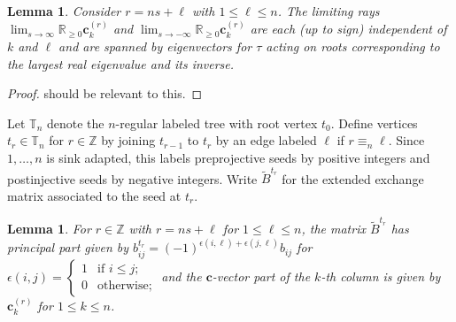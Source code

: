 \documentclass{amsart}
\newtheorem{lemma}[theorem]{Lemma}
\numberwithin{theorem}{section}
\newcommand{\bfc}{\boldsymbol{c}}
\newcommand{\RR}{\mathbb{R}}
\newcommand{\TT}{\mathbb{T}}
\newcommand{\ZZ}{\mathbb{Z}}
\begin{document}
  \begin{lemma}
    Consider $r=ns+\ell$ with $1\le\ell\le n$.
    The limiting rays $\lim_{s\to\infty} \RR_{\ge0}\bfc^{(r)}_k$ and $\lim_{s\to-\infty} \RR_{\ge0}\bfc^{(r)}_k$ are each (up to sign) independent of $k$ and $\ell$ and are spanned by eigenvectors for $\tau$ acting on roots corresponding to the largest real eigenvalue and its inverse.
  \end{lemma}
  \begin{proof}
    \cite{Tak94} should be relevant to this.
  \end{proof}

  Let $\TT_n$ denote the $n$-regular labeled tree with root vertex $t_0$.
  Define vertices $t_r\in\TT_n$ for $r\in\ZZ$ by joining $t_{r-1}$ to $t_r$ by an edge labeled $\ell$ if $r\equiv_n\ell$.
  Since $1,\ldots,n$ is sink adapted, this labels preprojective seeds by positive integers and postinjective seeds by negative integers.
  Write $\tilde B^{t_r}$ for the extended exchange matrix associated to the seed at $t_r$.
  \begin{lemma}
    \label{lem:preprojective exchange matrices}
    For $r\in\ZZ$ with $r=ns+\ell$ for $1\le \ell \le n$, the matrix $\tilde B^{t_r}$ has principal part given by $b^{t_r}_{ij}=(-1)^{\epsilon(i,\ell)+\epsilon(j,\ell)}b_{ij}$ for $\epsilon(i,j)=\begin{cases} 1 & \text{if $i\le j$;}\\ 0 & \text{otherwise;}\end{cases}$ and the $\bfc$-vector part of the $k$-th column is given by $\bfc^{(r)}_k$ for $1\le k\le n$.
  \end{lemma}
\end{document}
